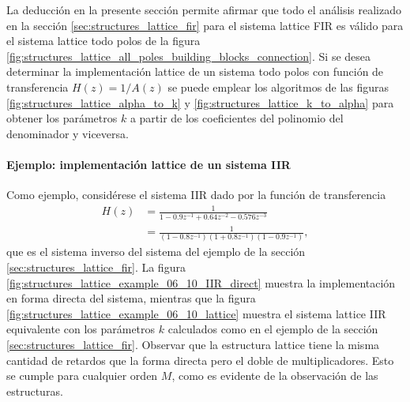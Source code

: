 \documentclass[a4paper]{report}
\begin{document}
La deducción en la presente sección permite afirmar que todo el análisis realizado en la sección \ref{sec:structures_lattice_fir} para el sistema lattice FIR es válido para el sistema lattice todo polos de la figura \ref{fig:structures_lattice_all_poles_building_blocks_connection}. Si se desea determinar la implementación lattice de un sistema todo polos con función de transferencia \(H(z)=1/A(z)\) se puede emplear los algoritmos de las figuras \ref{fig:structures_lattice_alpha_to_k} y \ref{fig:structures_lattice_k_to_alpha} para obtener los parámetros \(k\) a partir de los coeficientes del polinomio del denominador y viceversa.

\paragraph{Ejemplo: implementación lattice de un sistema IIR} Como ejemplo, considérese el sistema IIR  dado por la función de transferencia
\begin{align*}
 H(z)&=\frac{1}{1-0.9z^{-1}+0.64z^{-2}-0.576z^{-3}}\\
  &=\frac{1}{(1-0.8z^{-1})(1+0.8z^{-1})(1-0.9z^{-1})},
\end{align*}
que es el sistema inverso del sistema del ejemplo de la sección \ref{sec:structures_lattice_fir}. La figura \ref{fig:structures_lattice_example_06_10_IIR_direct} muestra la implementación en forma directa del sistema, mientras que la figura \ref{fig:structures_lattice_example_06_10_lattice} muestra el sistema lattice IIR equivalente con los parámetros \(k\) calculados como en el ejemplo de la sección \ref{sec:structures_lattice_fir}. Observar que la estructura lattice tiene la misma cantidad de retardos que la forma directa pero el doble de multiplicadores. Esto se cumple para cualquier orden \(M\), como es evidente de la observación de las estructuras.
\end{document}
